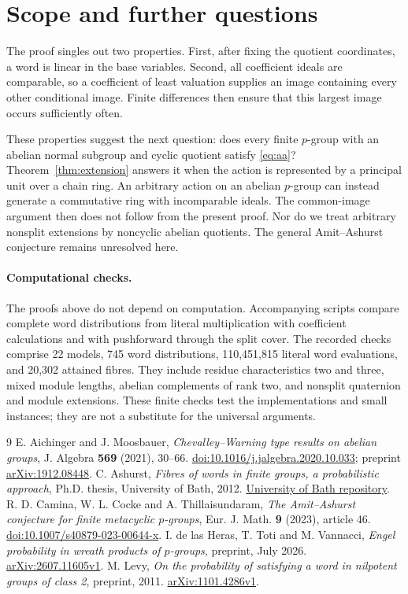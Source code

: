 \documentclass[11pt]{article}
\theoremstyle{remark}\newtheorem{remark}[theorem]{Remark}
\begin{document}
\section{Scope and further questions}
The proof singles out two properties. First, after fixing the quotient coordinates, a word is linear in the base variables. Second, all coefficient ideals are comparable, so a coefficient of least valuation supplies an image containing every other conditional image. Finite differences then ensure that this largest image occurs sufficiently often.

These properties suggest the next question: does every finite $p$-group with an abelian normal subgroup and cyclic quotient satisfy \eqref{eq:aa}? Theorem~\ref{thm:extension} answers it when the action is represented by a principal unit over a chain ring. An arbitrary action on an abelian $p$-group can instead generate a commutative ring with incomparable ideals. The common-image argument then does not follow from the present proof. Nor do we treat arbitrary nonsplit extensions by noncyclic abelian quotients. The general Amit--Ashurst conjecture remains unresolved here.

\paragraph{Computational checks.}
The proofs above do not depend on computation. Accompanying scripts compare complete word distributions from literal multiplication with coefficient calculations and with pushforward through the split cover. The recorded checks comprise 22 models, 745 word distributions, 110,451,815 literal word evaluations, and 20,302 attained fibres. They include residue characteristics two and three, mixed module lengths, abelian complements of rank two, and nonsplit quaternion and module extensions. These finite checks test the implementations and small instances; they are not a substitute for the universal arguments.

\begin{thebibliography}{9}
 E. Aichinger and J. Moosbauer, \emph{Chevalley--Warning type results on abelian groups}, J. Algebra \textbf{569} (2021), 30--66. \href{https://doi.org/10.1016/j.jalgebra.2020.10.033}{doi:10.1016/j.jalgebra.2020.10.033}; preprint \href{https://arxiv.org/abs/1912.08448}{arXiv:1912.08448}.
 C. Ashurst, \emph{Fibres of words in finite groups, a probabilistic approach}, Ph.D. thesis, University of Bath, 2012. \href{https://researchportal.bath.ac.uk/en/studentTheses/fibres-of-words-in-finite-groups-a-probabilistic-approach/}{University of Bath repository}.
 R. D. Camina, W. L. Cocke and A. Thillaisundaram, \emph{The Amit--Ashurst conjecture for finite metacyclic $p$-groups}, Eur. J. Math. \textbf{9} (2023), article 46. \href{https://doi.org/10.1007/s40879-023-00644-x}{doi:10.1007/s40879-023-00644-x}.
 I. de las Heras, T. Toti and M. Vannacci, \emph{Engel probability in wreath products of $p$-groups}, preprint, July 2026. \href{https://arxiv.org/abs/2607.11605}{arXiv:2607.11605v1}.
 M. Levy, \emph{On the probability of satisfying a word in nilpotent groups of class 2}, preprint, 2011. \href{https://arxiv.org/abs/1101.4286}{arXiv:1101.4286v1}.
\end{thebibliography}
\end{document}
